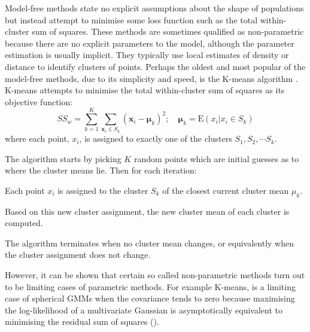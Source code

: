 Model-free methods state no explicit assumptions about the shape of populations but instead
attempt to minimise some loss function such as the total within-cluster sum of squares.
These methods are sometimes qualified as non-parametric because there are no explicit parameters to the model,
although the parameter estimation is usually implicit.
They typically use local estimates of density or distance to identify clusters of points.
Perhaps the oldest and most popular of the model-free methods, due to its simplicity and speed, is the K-means algorithm \citep{MacQueen:1967uv}.
K-means attempts to minimise the total within-cluster sum of squares as its objective function:
\begin{equation}
\label{equation:ssw}
SS_{w} = \sum_{k=1}^{K} \sum_{\mathbf x_i \in S_k} ( \mathbf x_i - \boldsymbol\mu_k )^2 ; \quad \boldsymbol\mu_k=\text{E}(x_i| x_i \in S_k)
\end{equation}
where each point, $x_i$, is assigned to exactly one of the clusters $S_1, S_2, \cdots S_k$.

The algorithm starts by picking $K$ random points which are initial guesses as to where the cluster means lie.
Then for each iteration:
\begin{itemise}
    \item Each point $x_i$ is assigned to the cluster $S_k$ of the closest current cluster mean $\mu_k$.
    \item Based on this new cluster assignment, the new cluster mean of each cluster is computed.
\end{itemise}
The algorithm terminates when no cluster mean changes, or equivalently when the cluster assignment does not change.

However, it can be shown that certain so called non-parametric methods turn out to be limiting cases of parametric methods.
For example K-means, is a limiting case of spherical \glspl{GMM} when the covariance tends to zero %
because maximising the log-likelihood of a multivariate Gaussian is asymptotically equivalent to minimising the residual sum of squares ().

